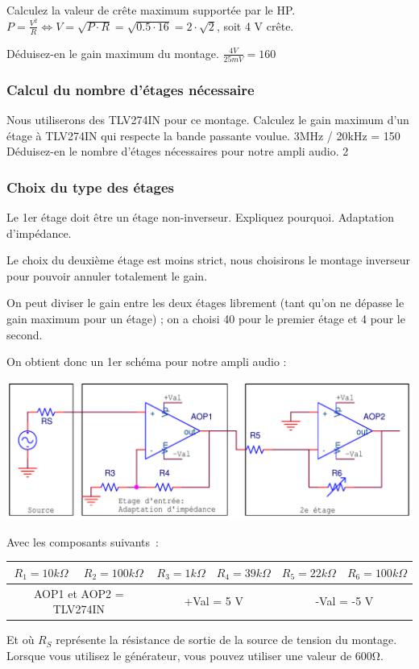{
Calculez la valeur de crête maximum supportée par le HP.
}
{$P = \frac{V^2}{R} \Leftrightarrow V = \sqrt{P \cdot R} = \sqrt{0.5 \cdot 16} = 2\cdot \sqrt{2}$, soit 4 V crête.}

{
Déduisez-en le gain maximum du montage.
}
{$\frac{4 V}{25 mV} = 160$}

\subsubsection{Calcul du nombre d'étages nécessaire}
Nous utiliserons des TLV274IN pour ce montage.
{
Calculez le gain maximum d'un étage à TLV274IN qui respecte la bande passante voulue.
}
{3MHz / 20kHz = 150}
{
Déduisez-en le nombre d'étages nécessaires pour notre ampli audio.
}
{2}


\subsubsection{Choix du type des étages}
{
Le 1er étage doit être un étage non-inverseur. Expliquez pourquoi.
}
{Adaptation d'impédance.}

Le choix du deuxième étage est moins strict, nous choisirons le montage inverseur pour pouvoir annuler totalement le gain.

On peut diviser le gain entre les deux étages librement (tant qu'on ne dépasse le gain maximum pour un étage) ; on a choisi 40 pour le premier étage et 4 pour le second.

On obtient donc un 1er schéma pour notre ampli audio :
\begin{center}
\includegraphics[width=14cm]{figures/AOP2etages.png}
\end{center}
Avec les composants suivants~:
\begin{center}
\begin{tabular}{|c||c||c||c||c||c|}\hline
$R_1 = 10 k\Omega$ & $R_2 = 100 k\Omega$ & $R_3 = 1 k\Omega$ & $R_4 = 39 k\Omega$ & $R_5 = 22 k\Omega$ & $R_6 = 100 k\Omega$ \\ \hline
\multicolumn{2}{|c||}{AOP1 et AOP2 = TLV274IN} & \multicolumn{2}{c||}{+Val = 5 V} & \multicolumn{2}{c|}{-Val = -5 V} \\ \hline
\end{tabular}
\end{center}
Et où $R_S$ représente la résistance de sortie de la source de tension du montage. Lorsque vous utilisez le générateur, vous pouvez utiliser une valeur de $600 \si{\ohm}$.

